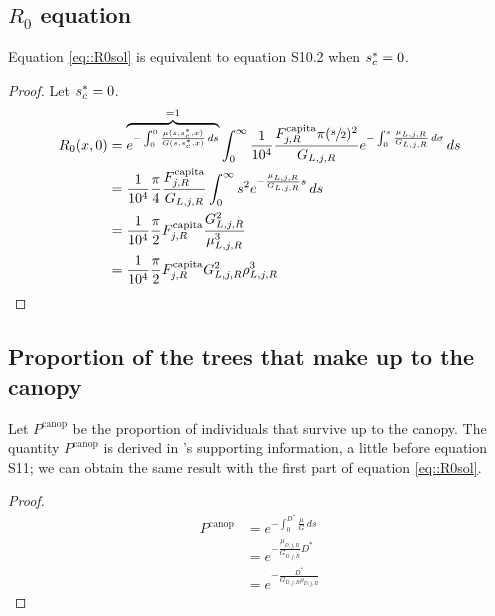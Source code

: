 \begin{refsection}
\subsection{$ R_0 $ equation \citep[p. 1479]{Purves2009}}
Equation \eqref{eq::R0sol} is equivalent to equation S10.2 \citep[also p. 1479 in his article]{Purves2009} when $ {s}^{*}_c = 0 $.
\begin{proof}
	Let $ {s}^{*}_c = 0 $.
	\begin{align*}
		R_0 (x, 0) &= \overbrace{e^{-\int_0^{0}\frac{\mu(s, {s}^{*}_c, x)}{G(s, {s}^{*}_c, x)} \, ds}}^{= 1} \int_{0}^{\infty} \frac{1}{10^4} \frac{F_{j, R}^{\text{capita}} \pi (\sfrac{s}{2})^2}{G_{L, j, R}} e^{-\int_{0}^{s} \frac{\mu_{L, j, R}}{G_{L, j, R}} \, d\sigma} \, ds \\
			&= \frac{1}{10^4} \frac{\pi}{4} \frac{F_{j, R}^{\text{capita}}}{G_{L, j, R}} \int_{0}^{\infty} s^2 e^{-\frac{\mu_{L, j, R}}{G_{L, j, R}} s} \, ds \\
			&= \frac{1}{10^4} \frac{\pi}{2} F_{j, R}^{\text{capita}} \frac{G_{L, j, R}^2}{\mu_{L, j, R}^3} \\
			&= \frac{1}{10^4} \frac{\pi}{2} F_{j, R}^{\text{capita}} G_{L, j, R}^2 \rho_{L, j, R}^3
	\end{align*}
\end{proof}

\subsection{Proportion of the trees that make up to the canopy}
Let $ P^{\text{canop}} $ be the proportion of individuals that survive up to the canopy. The quantity $ P^{\text{canop}} $ is derived in \citet{Purves2009}'s supporting information, a little before equation S11; we can obtain the same result with the first part of equation \eqref{eq::R0sol}.
\begin{proof}
	\begin{align*}
		P^{\text{canop}} &= e^{-\int_{0}^{D^{*}} \frac{\mu}{G} \, ds} \\
			&= e^{-\frac{\mu_{D, j, R}}{G_{D, j, R}} D^{*}} \\
			&= e^{-\frac{D^{*}}{G_{D, j, R}\rho_{D, j, R}}}
	\end{align*}
\end{proof}


\end{refsection}
